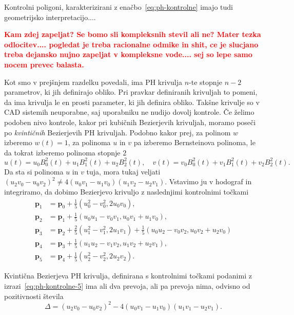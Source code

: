 \documentclass[isrm2, tisk]{fmfdelo}
\newcommand{\p}{\mathbf{p}}
\newcommand{\mycomment}[1]{\textbf{\textcolor{red}{#1}}}
\begin{document}
    Kontrolni poligoni, karakterizirani z enačbo~\eqref{eq:ph-kontrolne} imajo tudi geometrijsko interpretacijo....

    \mycomment{ Kam zdej zapeljat? Se bomo sli kompleksnih stevil ali ne? Mater tezka odlocitev.... pogledat je treba racionalne odmike in shit, ce je slucjano treba dejansko nujno zapeljat v kompleksne vode.... sej so lepe samo nocem prevec balasta.}

    Kot smo v prejšnjem razdelku povedali, ima PH krivulja $n$-te stopnje $n-2$ parametrov, ki jih definirajo obliko.
    Pri pravkar definiranih krivuljah to pomeni, da ima krivulja le en prosti parameter, ki jih definira obliko.
    Takšne krivulje so v CAD sistemih neuporabne, saj uporabniku ne nudijo dovolj kontrole.
    Če želimo podoben nivo kontrole, kakor pri kubičnih Bezierjevih krivuljah, moramo poseči po \textit{kvintičnih} Bezierjevih PH krivuljah.
    Podobno kakor prej, za polinom $w$ izberemo $w(t)=1$, za polinoma $u$ in $v$ pa izberemo Bernsteinova polinoma, le da tokrat izberemo polinoma stopnje $2$
    \[u(t)=u_0B_{0}^{2}(t)+u_1B_{1}^{2}(t)+u_2B_{2}^{2}(t),\quad v(t)=v_0B_{0}^{2}(t)+v_1B_{1}^{2}(t)+v_2B_{2}^{2}(t).\]
    Da sta si polinoma $u$ in $v$ tuja, mora tukaj veljati $(u_2 v_0 -u_0 v_2)^2 \neq 4(u_0 v_1 - u_1 v_0)(u_1 v_2-u_2v_1)$.
    Vstavimo ju v hodograf in integriramo, da dobimo Bezierjevo krivuljo z naslednjimi kontrolnimi točkami
    \begin{align}
        \p_1 &=\p_0+\frac{1}{5}(u_0^2-v_0^2,2u_0v_0), \nonumber\\
        \p_2 &= \p_1+\frac{1}{5}(u_0u_1-v_0v_1, u_0v_1+u_1v_0),\nonumber\\
        \p_3 &= \p_2 + \frac{2}{5}(u_1^2-v_1^2, 2u_1v_1) + \frac{1}{5}(u_0u_2-v_0v_2, u_0v_2+u_2v_0) \nonumber \\
        \p_4 &= \p_3+\frac{1}{5}(u_1u_2-v_1v_2, u_1v_2+u_2v_1),\nonumber\\
        \p_5 &=\p_4+\frac{1}{5}(u_2^2-v_2^2,2u_2v_2).  \label{eq:ph-kontrolne-5}
    \end{align}

    \begin{lema}
        Kvintična Bezierjeva PH krivulja, definirana s kontrolnimi točkami podanimi z izrazi~\eqref{eq:ph-kontrolne-5} ima ali dva prevoja, ali pa prevoja nima, odvisno od pozitivnosti števila \[\Delta = (u_2v_0-u_0v_2)^2 - 4(u_0v_1-u_1v_0)(u_1v_1-u_2v_1).\]
    \end{lema}
\end{document}
